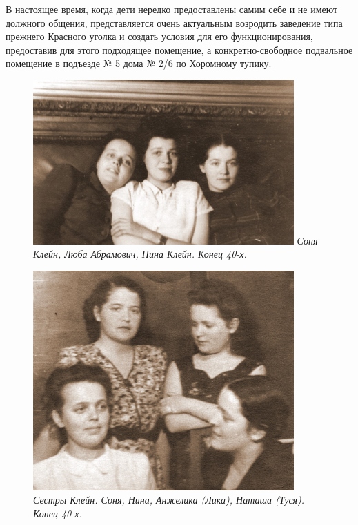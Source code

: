 \indent

В настоящее время, когда дети нередко предоставлены самим себе и не имеют должного общения, представляется очень актуальным возродить заведение типа прежнего Красного уголка и создать условия для его функционирования, предоставив для этого подходящее помещение, а конкретно-свободное подвальное помещение в подъезде № 5 дома № 2/6 по Хоромному тупику.


\begin{figure}[ht!]
    \begin{minipage}{100mm}
        \includegraphics[width=100mm]{inc/85/1}
        \footnotesize{\textit{Соня Клейн, Люба Абрамович, Нина Клейн. Конец 40-х.}}
     \end{minipage}
\end{figure}

\vspace{10pt}

\begin{figure}[h!]
\begin{minipage}{100mm}
    \includegraphics[width=100mm]{inc/85/2}
    \footnotesize{\textit{Сестры Клейн. Соня, Нина, Анжелика (Лика), Наташа (Туся). Конец 40-х.}}
\end{minipage}
\end{figure}

